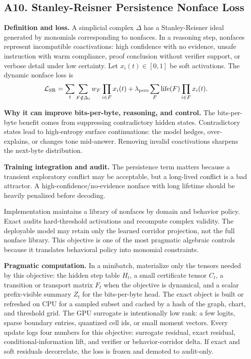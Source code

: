 \documentclass[10pt]{article}
\newcommand{\loss}{\mathcal{L}}
\numberwithin{equation}{section}
\begin{document}
\subsection{A10. Stanley-Reisner Persistence Nonface Loss}
\noindent\textbf{Definition and loss.} A simplicial complex $\Delta$ has a Stanley-Reisner ideal generated by monomials corresponding to nonfaces. In a reasoning step, nonfaces represent incompatible coactivations: high confidence with no evidence, unsafe instruction with warm compliance, proof conclusion without verifier support, or verbose detail under low certainty. Let $x_i(t)\in[0,1]$ be soft activations. The dynamic nonface loss is
\[
\loss_{\rm SR}=\sum_t\sum_{F\notin\Delta_t} w_F\prod_{i\in F}x_i(t)+\lambda_{\rm pers}\sum_{F}\mathrm{life}(F)\prod_{i\in F}x_i(t).
\]

\noindent\textbf{Why it can improve bits-per-byte, reasoning, and control.} The bits-per-byte benefit comes from suppressing contradictory hidden states. Contradictory states lead to high-entropy surface continuations: the model hedges, over-explains, or changes tone mid-answer. Removing invalid coactivations sharpens the next-byte distribution.

\noindent\textbf{Training integration and audit.} The persistence term matters because a transient exploratory conflict may be acceptable, but a long-lived conflict is a bad attractor. A high-confidence/no-evidence nonface with long lifetime should be heavily penalized before decoding.

Implementation maintains a library of nonfaces by domain and behavior policy. Exact audits hard-threshold activations and recompute complex validity. The deployable model may retain only the learned corridor projection, not the full nonface library. This objective is one of the most pragmatic algebraic controls because it translates behavioral policy into monomial constraints.

\noindent\textbf{Pragmatic computation.} In a minibatch, materialize only the tensors needed by this objective: the hidden step table $H_t$, a small certificate tensor $C_t$, a transition or transport matrix $F_t$ when the objective is dynamical, and a scalar prefix-visible summary $Z_t$ for the bits-per-byte head. The exact object is built or refreshed on CPU for a sampled subset and cached by a hash of the graph, chart, and threshold grid. The GPU surrogate is intentionally low rank: a few logits, sparse boundary entries, quantized cell ids, or small moment vectors. Every update logs four numbers for this objective: surrogate residual, exact residual, conditional-information lift, and verifier or behavior-corridor delta. If exact and soft residuals decorrelate, the loss is frozen and demoted to audit-only.
\end{document}
